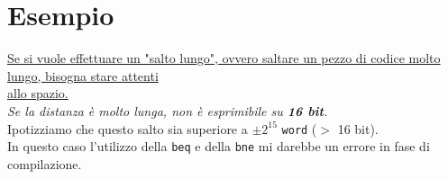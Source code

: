 \documentclass[../main.tex]{subfiles}
\begin{document}
\section*{Esempio}
\underline{Se si vuole effettuare un "salto lungo", ovvero saltare un pezzo
di codice molto lungo, bisogna stare attenti} \\
\underline{allo spazio.} \\
\textit{Se la distanza è molto lunga, non è esprimibile su \textbf{16 bit}.}
\\[2mm]
Ipotizziamo che questo salto sia superiore a
$\pm$\hspace*{.3mm}$\text{2}^\text{15}$ \texttt{word} ($>$ 16 bit). \\
In questo caso l'utilizzo della \texttt{beq} e della \texttt{bne} mi
darebbe un errore in fase di compilazione.
\\[5mm]
\end{document}
